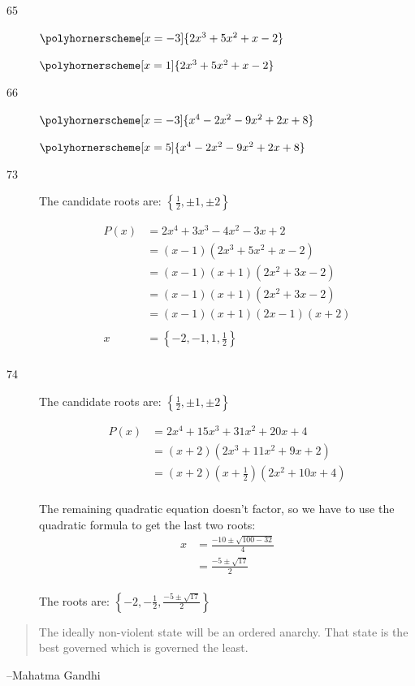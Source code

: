 \documentclass{exam}
\begin{document}
\begin{description}
    \pagebreak

      \item[65]
        $\polyhornerscheme[x = -3]{2x^3 + 5x^2 + x - 2}$

        $\polyhornerscheme[x = 1]{2x^3 + 5x^2 + x - 2}$

      \item[66]
        $\polyhornerscheme[x = -3]{x^4 - 2x^2 - 9x^2 + 2x + 8}$

        $\polyhornerscheme[x = 5]{x^4 - 2x^2 - 9x^2 + 2x + 8}$

      \item[73]
        The candidate roots are: $\left\{\frac{1}{2}, \pm 1, \pm 2\right\}$
        
        \begin{align*}
          P(x) &= 2x^4 + 3x^3 - 4x^2 - 3x + 2 \\
               &= (x - 1)(2x^3 + 5x^2 + x - 2) \\
               &= (x - 1)(x + 1)(2x^2 + 3x - 2) \\
               &= (x - 1)(x + 1)(2x^2 + 3x - 2) \\
               &= (x - 1)(x + 1)(2x - 1)(x + 2) \\
               \\
          x    &= \left\{ -2, -1, 1, \frac{1}{2} \right\} \\
        \end{align*}

    \pagebreak

      \item[74]
        The candidate roots are: $\left\{\frac{1}{2}, \pm 1, \pm 2\right\}$
        
        \begin{align*}
          P(x) &= 2x^4 + 15x^3 + 31x^2 + 20x + 4 \\
               &= (x + 2)(2x^3 + 11x^2 + 9x + 2) \\
               &= (x + 2)\left( x + \frac{1}{2} \right)(2x^2 + 10x + 4) \\
        \end{align*}

        The remaining quadratic equation doesn't factor, so we have to use the quadratic formula to get the last two
        roots:
        \begin{align*}
          x &= \frac{-10 \pm \sqrt{100 - 32}}{4} \\
            &= \frac{-5 \pm \sqrt{17}}{2} \\
        \end{align*}

        The roots are: $\left\{ -2, -\frac{1}{2}, \frac{-5 \pm \sqrt{17}}{2} \right\}$

    \end{description}

  \else
    \vspace{2 cm}
    \begin{quote}
      \begin{em}
        The ideally non-violent state will be an ordered anarchy. That state is the best governed which is governed the
        least.
      \end{em}
    \end{quote}

    \hspace{1 cm} --Mahatma Gandhi

  \fi
\end{document}
